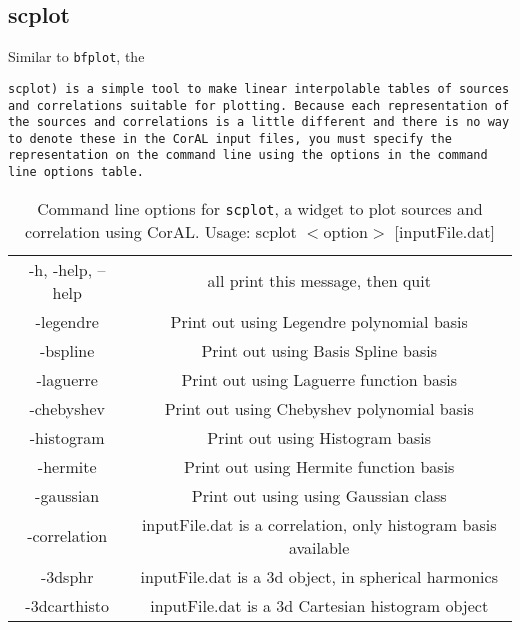\documentclass[10pt]{article}
\begin{document}
\subsection{scplot}
Similar to {\tt bfplot}, the {\tt scplot) is a simple tool to make linear interpolable tables of sources and correlations suitable for plotting.  Because each representation of the sources and correlations is a little different and there is no way to denote these in the CorAL input files, you must specify the representation on the command line using the options in the command line options table.

	\begin{table}[htdp]
	\caption{Command line options for {\tt scplot}, a widget to plot sources and correlation using CorAL.  Usage: scplot $<$option$>$ [inputFile.dat]}
	\begin{center}
	\begin{tabular}{|c|c|}
		-h, -help, --help &  all print this message, then quit\\
		-legendre       	& Print out using Legendre polynomial basis\\
		-bspline        	& Print out using Basis Spline basis\\
		-laguerre       	& Print out using Laguerre function basis\\
		-chebyshev      & Print out using Chebyshev polynomial basis\\
		-histogram      	& Print out using Histogram basis\\
		-hermite        	& Print out using Hermite function basis\\
		-gaussian       	& Print out using using Gaussian class\\
		-correlation    	& inputFile.dat is a correlation, only histogram basis available\\
		-3dsphr         	& inputFile.dat is a 3d object, in spherical harmonics\\
		-3dcarthisto    	& inputFile.dat is a 3d Cartesian histogram object
	\end{tabular}
	\end{center}
	\label{default}
	\end{table}%

}
\end{document}

